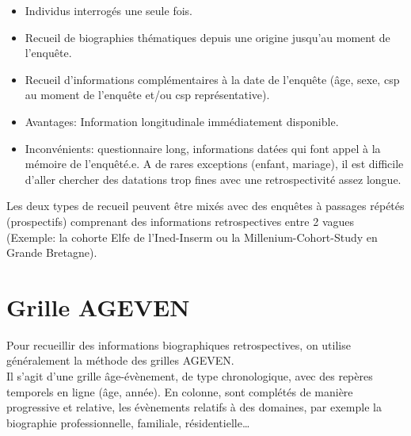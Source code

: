 \documentclass[
  12pt,
  letterpaper,
  DIV=11,
  numbers=noendperiod,
  onepage,
  openany]{scrreprt}
\providecommand{\tightlist}{%
  \setlength{\itemsep}{0pt}\setlength{\parskip}{0pt}}\usepackage{longtable,booktabs,array}
\begin{document}
\begin{itemize}
\tightlist
\item
  Individus interrogés une seule fois.
\item
  Recueil de biographies thématiques depuis une origine jusqu'au moment
  de l'enquête.
\item
  Recueil d'informations complémentaires à la date de l'enquête (âge,
  sexe, csp au moment de l'enquête et/ou csp représentative).
\item
  Avantages: Information longitudinale immédiatement disponible.
\item
  Inconvénients: questionnaire long, informations datées qui font appel
  à la mémoire de l'enquêté.e. A de rares exceptions (enfant, mariage),
  il est difficile d'aller chercher des datations trop fines avec une
  retrospectivité assez longue.
\end{itemize}

Les deux types de recueil peuvent être mixés avec des enquêtes à
passages répétés (prospectifs) comprenant des informations
retrospectives entre 2 vagues (Exemple: la cohorte Elfe de l'Ined-Inserm
ou la Millenium-Cohort-Study en Grande Bretagne).

\hypertarget{grille-ageven}{%
\section{Grille AGEVEN}\label{grille-ageven}}

Pour recueillir des informations biographiques retrospectives, on
utilise généralement la méthode des grilles AGEVEN.\\
Il s'agit d'une grille âge-évènement, de type chronologique, avec des
repères temporels en ligne (âge, année). En colonne, sont complétés de
manière progressive et relative, les évènements relatifs à des domaines,
par exemple la biographie professionnelle, familiale,
résidentielle\ldots{}
\end{document}
